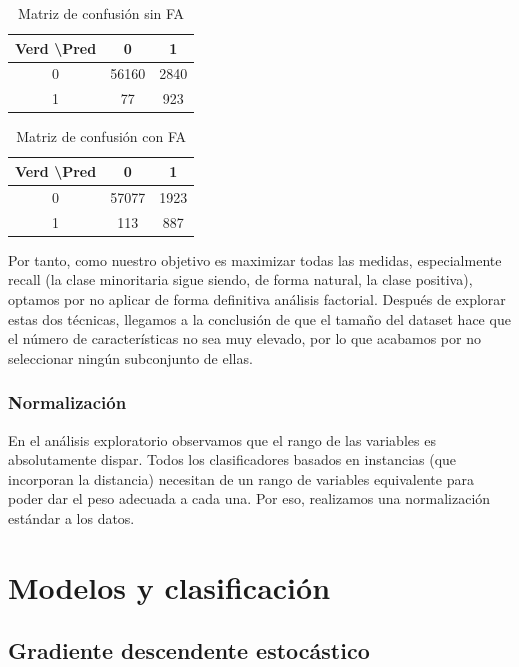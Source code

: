 \begin{table}[H]
	\centering
	\begin{tabular}{|c|c|c|}
		\hline
		Verd \textbackslash Pred & 0     & 1    \\ \hline
		0                        & 56160 & 2840 \\ \hline
		1                        & 77    & 923  \\ \hline
	\end{tabular}
	\caption{Matriz de confusión sin FA}
\end{table}

\begin{table}[H]
	\centering
	\begin{tabular}{|c|c|c|}
		\hline
		Verd \textbackslash Pred & 0     & 1    \\ \hline
		0                        & 57077 & 1923 \\ \hline
		1                        & 113   & 887  \\ \hline
	\end{tabular}
	\caption{Matriz de confusión con FA}
\end{table}

Por tanto, como nuestro objetivo es maximizar todas las medidas, especialmente recall (la clase minoritaria sigue siendo, de forma natural, la clase positiva), optamos por no aplicar de forma definitiva análisis factorial. Después de explorar estas dos técnicas, llegamos a la conclusión de que el tamaño del dataset hace que el número de características no sea muy elevado, por lo que acabamos por no seleccionar ningún subconjunto de ellas.

\subsubsection{Normalización}

En el análisis exploratorio observamos que el rango de las variables es absolutamente dispar. Todos los clasificadores basados en instancias (que incorporan la distancia) necesitan de un rango de variables equivalente para poder dar el peso adecuada a cada una. Por eso, realizamos una normalización estándar a los datos.

\section{Modelos y clasificación}

\subsection{Gradiente descendente estocástico}


